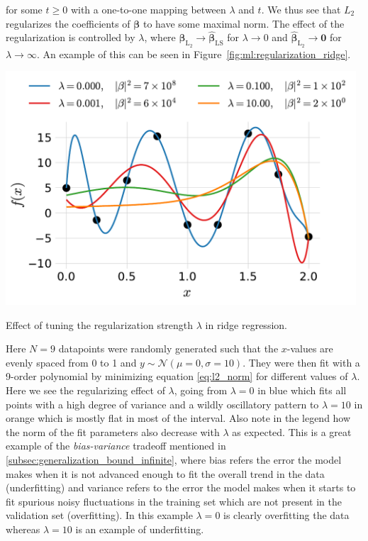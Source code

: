 \documentclass[a4paper, twoside, nobib]{tufte-book}
\renewcommand{\vec}[1]{\mathbf{#1}}
\begin{document}
for some $t \geq 0$ with a one-to-one mapping between $\lambda$ and $t$. We thus see that $L_2$ regularizes the coefficients of $\bm{\beta}$ to have some maximal norm. The effect of the regularization is controlled by $\lambda$, where $\hat{\bm{\beta}}_{\mathrm{L_2}} \rightarrow \hat{\bm{\beta}}_{\mathrm{LS}}$ for $\lambda \rightarrow 0$ and $\hat{\bm{\beta}}_{\mathrm{L_2}} \rightarrow \vec{0}$ for $\lambda \rightarrow \infty$. An example of this can be seen in Figure~\ref{fig:ml:regularization_ridge}. 
\begin{marginfigure}
  \includegraphics[width=0.98\textwidth]{figures/ridge_regression/ridge.pdf}
  \caption[Regularization Effect]
    {Effect of tuning the regularization strength $\lambda$ in ridge regression.
    }
  \label{fig:ml:regularization_ridge}
\end{marginfigure}
Here $N=9$ datapoints were randomly generated such that the $x$-values are evenly spaced from 0 to 1 and $y \sim \mathcal{N}(\mu=0, \sigma=10)$. They were then fit with a 9-order polynomial by minimizing equation \eqref{eq:l2_norm} for different values of $\lambda$. Here we see the regularizing effect of $\lambda$, going from $\lambda=0$ in blue which fits all points with a high degree of variance and a wildly oscillatory pattern to $\lambda=10$ in orange which is mostly flat in most of the interval. Also note in the legend how the norm of the fit parameters also decrease with $\lambda$ as expected. This is a great example of the \emph{bias-variance} tradeoff mentioned in \autoref{subsec:generalization_bound_infinite}, where bias refers the error the model makes when it is not advanced enough to fit the overall trend in the data (underfitting) and variance refers to the error the model makes when it starts to fit spurious noisy fluctuations in the training set which are not present in the validation set (overfitting). In this example $\lambda=0$ is clearly overfitting the data whereas $\lambda=10$ is an example of underfitting. 
\end{document}
